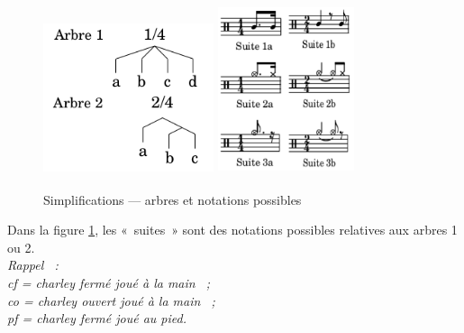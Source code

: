 \begin{figure}[h]
	\centering
	\includegraphics[height=45mm, width=50mm]{
    z_images/3_methodes/2_systemes/simplification_0.png}
	\includegraphics[height=50mm, width=40mm]{
    z_images/3_methodes/2_systemes/simplification_2.png}
	\caption{Simplifications — arbres et notations possibles}
	\label{simpl}
\end{figure}

Dans la figure \ref{simpl}, les «~suites~» sont des notations possibles
relatives aux arbres 1 ou 2.\\

\textit{Rappel~ :\\cf = charley fermé joué à la main~ ;\\co = charley ouvert joué
à la main~ ;\\ pf = charley fermé joué au pied.}\\

